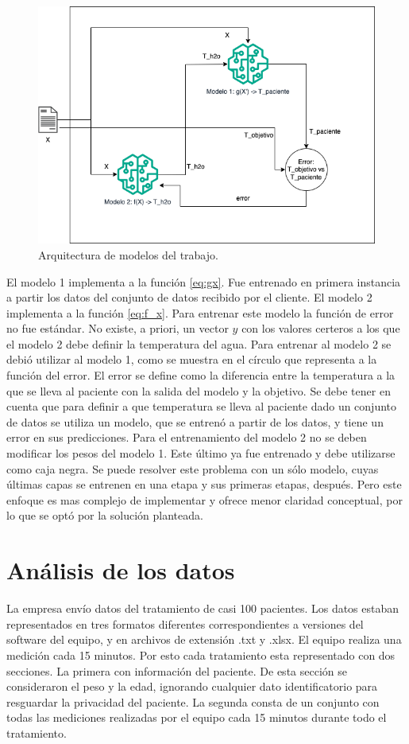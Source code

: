 \begin{figure}[htbp]
	\centering
	\includegraphics[width=1\textwidth]{./Figures/arquitectura_v2.png}
	\caption{Arquitectura de modelos del trabajo.}
	\label{fig:architecture}
\end{figure}

El modelo 1 implementa a la función \ref{eq:gx}. Fue entrenado en primera instancia a partir los datos del conjunto de datos recibido por el cliente. 
El modelo 2 implementa a la función \ref{eq:f_x}. Para entrenar este modelo la función de error no fue estándar. No existe, a priori, un vector $y$ con los valores certeros a los que el modelo 2 debe definir la temperatura del agua. Para entrenar al modelo 2 se debió utilizar al modelo 1, como se muestra en el círculo que representa a la función del error. El error se define como la diferencia entre la temperatura a la que se lleva al paciente con la salida del modelo y la objetivo. 
Se debe tener en cuenta que para definir a que temperatura se lleva al paciente dado un conjunto de datos se utiliza un modelo, que se entrenó a partir de los datos, y tiene un error en sus predicciones. 
Para el entrenamiento del modelo 2 no se deben modificar los pesos del modelo 1. Este último ya fue entrenado y debe utilizarse como caja negra. 
Se puede resolver este problema con un sólo modelo, cuyas últimas capas se entrenen en una etapa y sus primeras etapas, después. Pero este enfoque es mas complejo de implementar y ofrece menor claridad conceptual, por lo que se optó por la solución planteada.


\section{Análisis de los datos}
La empresa envío datos del tratamiento de casi 100 pacientes. Los datos estaban representados en tres formatos diferentes correspondientes a versiones del software del equipo, y en archivos de extensión .txt y .xlsx.
El equipo realiza una medición cada 15 minutos. Por esto cada tratamiento esta representado con dos secciones. La primera con información del paciente. De esta sección se consideraron el peso y la edad, ignorando cualquier dato identificatorio para resguardar la privacidad del paciente. La segunda consta de un conjunto con todas las mediciones realizadas por el equipo cada 15 minutos durante todo el tratamiento. 

